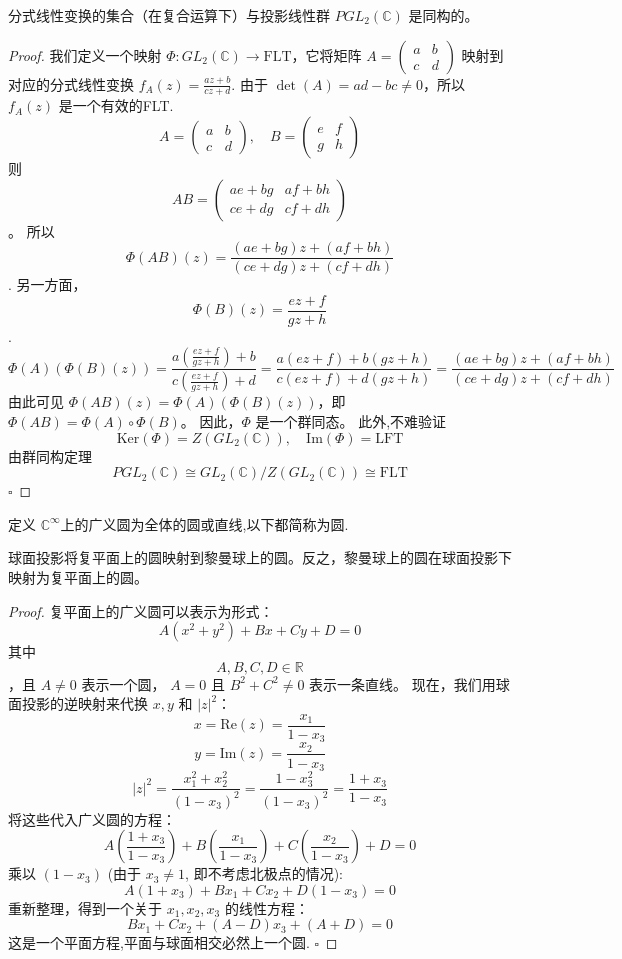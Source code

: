 \documentclass[../../复变函数.tex]{subfiles}
\begin{document}
\begin{theorem}
    分式线性变换的集合（在复合运算下）与投影线性群 $PGL_2(\mathbb{C})$ 是同构的。
\end{theorem}
\begin{proof}
    我们定义一个映射 $\Phi: GL_2(\mathbb{C}) \to \text{FLT}$，它将矩阵 $A = \begin{pmatrix} a & b \\ c & d \end{pmatrix}$ 映射到对应的分式线性变换 $f_A(z) = \frac{az+b}{cz+d}$.
由于 $\det(A) = ad-bc \neq 0$，所以 $f_A(z)$ 是一个有效的FLT. $$A = \begin{pmatrix} a & b \\ c & d \end{pmatrix},\quad B = \begin{pmatrix} e & f \\ g & h \end{pmatrix}$$ 
则 $$AB = \begin{pmatrix} ae+bg & af+bh \\ ce+dg & cf+dh \end{pmatrix}$$。
所以 $$\Phi(AB)(z) = \frac{(ae+bg)z + (af+bh)}{(ce+dg)z + (cf+dh)}$$.
另一方面，
$$\Phi(B)(z) = \frac{ez+f}{gz+h}$$.
$$\Phi(A)(\Phi(B)(z)) = \frac{a(\frac{ez+f}{gz+h}) + b}{c(\frac{ez+f}{gz+h}) + d} = \frac{a(ez+f) + b(gz+h)}{c(ez+f) + d(gz+h)}= \frac{(ae+bg)z + (af+bh)}{(ce+dg)z + (cf+dh)}$$
由此可见 $\Phi(AB)(z) = \Phi(A)(\Phi(B)(z))$，即 $\Phi(AB) = \Phi(A) \circ \Phi(B)$。
因此，$\Phi$ 是一个群同态。
此外,不难验证 \[
\text{Ker}(\Phi) = Z(GL_2(\mathbb{C})),\quad  \text{Im}(\Phi)= \mathrm{LFT}
\]由群同构定理\[
PGL_2(\mathbb{C}) \cong GL_2(\mathbb{C}) / Z(GL_2(\mathbb{C})) \cong \text{FLT}
\]
    \hfill $\square$
\end{proof}

\begin{definition}
    定义 \(  \mathbb{C} ^{\infty}  \)上的广义圆为全体的圆或直线,以下都简称为圆. 
\end{definition}
\begin{theorem}
    球面投影将复平面上的圆映射到黎曼球上的圆。反之，黎曼球上的圆在球面投影下映射为复平面上的圆。
\end{theorem}
\begin{proof}
    复平面上的广义圆可以表示为形式：
$$A(x^2+y^2) + Bx + Cy + D = 0$$
其中 $$A, B, C, D \in \mathbb{R}$$，且 $A \neq 0$ 表示一个圆， $A = 0$ 且 $B^2+C^2 \neq 0$ 表示一条直线。
现在，我们用球面投影的逆映射来代换 $x, y$ 和 $|z|^2$：
$$x = \text{Re}(z) = \frac{x_1}{1-x_3}$$
$$y = \text{Im}(z) = \frac{x_2}{1-x_3}$$
$$|z|^2 = \frac{x_1^2+x_2^2}{(1-x_3)^2} = \frac{1-x_3^2}{(1-x_3)^2} = \frac{1+x_3}{1-x_3}$$
将这些代入广义圆的方程：
$$A \left(\frac{1+x_3}{1-x_3}\right) + B \left(\frac{x_1}{1-x_3}\right) + C \left(\frac{x_2}{1-x_3}\right) + D = 0$$
乘以 $(1-x_3)$ (由于 $x_3 \neq 1$, 即不考虑北极点的情况):
$$A(1+x_3) + Bx_1 + Cx_2 + D(1-x_3) = 0$$
重新整理，得到一个关于 $x_1, x_2, x_3$ 的线性方程：
$$Bx_1 + Cx_2 + (A-D)x_3 + (A+D) = 0$$
这是一个平面方程,平面与球面相交必然上一个圆.
    \hfill $\square$
\end{proof}
\end{document}
